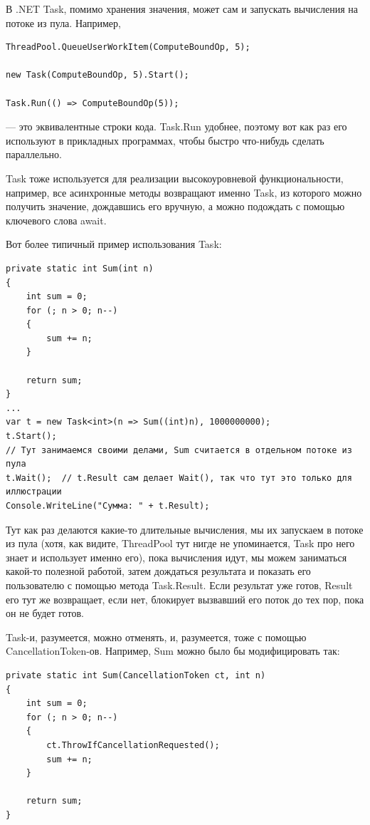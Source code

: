 \documentclass[a5paper]{article}
\begin{document}
В .NET Task, помимо хранения значения, может сам и запускать вычисления на потоке из пула. Например,

\begin{verbatim}
ThreadPool.QueueUserWorkItem(ComputeBoundOp, 5);

new Task(ComputeBoundOp, 5).Start();

Task.Run(() => ComputeBoundOp(5));
\end{verbatim}

--- это эквивалентные строки кода. Task.Run удобнее, поэтому вот как раз его используют в прикладных программах, чтобы быстро что-нибудь сделать параллельно.

Task тоже используется для реализации высокоуровневой функциональности, например, все асинхронные методы возвращают именно Task, из которого можно получить значение, дождавшись его вручную, а можно подождать с помощью ключевого слова await.

Вот более типичный пример использования Task:

\begin{verbatim}
private static int Sum(int n) 
{
    int sum = 0;
    for (; n > 0; n--)
    {
        sum += n;
    }

    return sum;
}
...
var t = new Task<int>(n => Sum((int)n), 1000000000);
t.Start();
// Тут занимаемся своими делами, Sum считается в отдельном потоке из пула
t.Wait();  // t.Result сам делает Wait(), так что тут это только для иллюстрации
Console.WriteLine("Сумма: " + t.Result);
\end{verbatim}

Тут как раз делаются какие-то длительные вычисления, мы их запускаем в потоке из пула (хотя, как видите, ThreadPool тут нигде не упоминается, Task про него знает и использует именно его), пока вычисления идут, мы можем заниматься какой-то полезной работой, затем дождаться результата и показать его пользователю с помощью метода Task.Result. Если результат уже готов, Result его тут же возвращает, если нет, блокирует вызвавший его поток до тех пор, пока он не будет готов.

Task-и, разумеется, можно отменять, и, разумеется, тоже с помощью CancellationToken-ов. Например, Sum можно было бы модифицировать так:

\begin{verbatim}
private static int Sum(CancellationToken ct, int n) 
{
    int sum = 0;
    for (; n > 0; n--) 
    {
        ct.ThrowIfCancellationRequested();
        sum += n;
    }
    
    return sum;
}
\end{verbatim}
\end{document}
